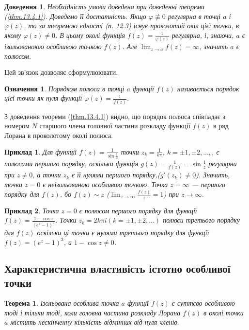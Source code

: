 \documentclass[fontsize=14pt]{scrartcl}
\newtheorem{exm}{Приклад}[section]
\theoremstyle{theorem}
\newtheorem{thm}{Теорема}[section]
\newtheorem{ozn}{Означення}[section]
\theoremstyle{proof}
\newtheorem*{dov}{Доведення}
\begin{document}
\begin{dov}
Необхідність умови доведена при доведенні теореми (\ref{thm.13.4.1}). Доведемо її достатність. Якщо $\varphi \not\equiv 0$ регулярна в точці $a$ і $\varphi(z)$, то за теоремою єдності (п. 12.3) існує проколотий окіл цієї точки, в якому $\varphi(z)\neq 0$. В цьому околі функція $f(z)=\frac{1}{\varphi(z)}$ регулярна, і, знаючи, $a$ є ізольованоюю особливою точкою $f(z)$. Але $\lim_{z \to a}f(z)=\infty$, значить $a$ є полюсом.
\end{dov}
Цей зв'язок дозволяє сформулюювати.

\begin{ozn}
  Порядком полюса в точці $a$ функції $f(z)$ називається порядок цієї точки як нуля функції $\varphi(z)=\frac{1}{f(z)}$.
\end{ozn}

З доведення теореми (\ref{thm.13.4.1}) видно, що порядок полюса співпадає з номером $N$ старшого члена головної частини розкладу функції $f(z)$ в ряд Лорана в проколотому околі полюса.

\begin{exm}
Для функції $f(z)=\frac{1}{\sin\frac{1}{z}}$ точки $z_k=\frac{1}{k\pi}$, $k=\pm 1, \pm 2, \dots,$, є полюсами першого порядку, оскільки функція $g(z)=\frac{1}{f(z)}=\sin\frac{1}{z}$ регулярна при $z\neq 0$, а точки $z_k$ є її нулями першого порядку,($g'(z_k)\neq 0$). Значить, точки $z=0$ є неізольованою особливою точкою. Точка $z=\infty$ --- першого порядку для $f(z)$, бо $f(z)\sim z$ ($\lim_{z \to \infty}\frac{f(z)}{z}=1$) при $z \to \infty$.
\end{exm}

\begin{exm}
Точка $z=0$ є полюсом першого порядку для функції $f(z)=\frac{1-\cos z}{(e^z-1)^3}$. Точки $z_k=2k\pi i (k=\pm 1, \pm 2,\dots)$ полюси третього порядку для $f(z)$ оскільки ці точки є нулями третього порядку для функції $f(z)=(e^z-1)^3$, а $1-\cos z \neq 0$.
\end{exm}

\subsection{Характеристична властивість істотно особливої точки}\label{13.5}

\begin{thm}\label{thm.13.5.1}
  Ізольована особлива точка $a$ функції $f(z)$ є суттєво особливою тоді і тільки тоді, коли головна частина розкладу Лорана $f(z)$ в околі точки $a$ містить нескінченну кількість відмінних від нуля членів.
\end{thm}
\end{document}
